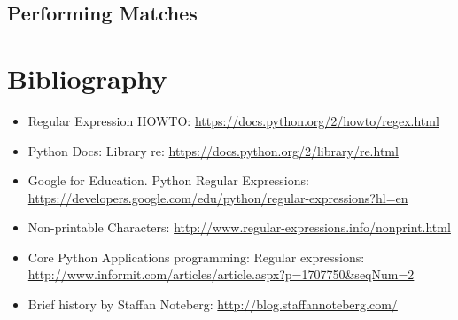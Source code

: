 \documentclass{beamer}
\begin{document}
\subsection{Performing Matches}
\begin{frame}[fragile]
\end{frame}

\section{Bibliography}
\begin{frame}
\begingroup
 \fontsize{6pt}{8pt}\selectfont
\begin{itemize}
\item Regular Expression HOWTO: \url{https://docs.python.org/2/howto/regex.html}
\item Python Docs: Library re: \url{https://docs.python.org/2/library/re.html}
\item Google for Education. Python Regular Expressions: \url{https://developers.google.com/edu/python/regular-expressions?hl=en}
\item Non-printable Characters: \url{http://www.regular-expressions.info/nonprint.html}
\item Core Python Applications programming: Regular expressions: \url{http://www.informit.com/articles/article.aspx?p=1707750&seqNum=2}
\item Brief history by Staffan Noteberg: \url{http://blog.staffannoteberg.com/}
\end{itemize}
\endgroup
\end{frame}
\end{document}
